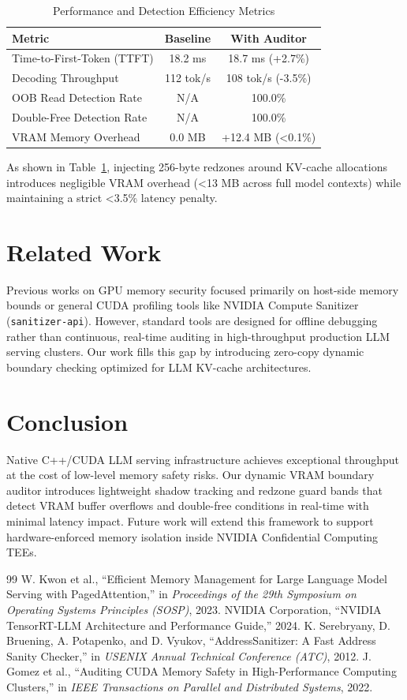 \documentclass[10pt,twocolumn,a4paper]{article}
\begin{document}
\begin{table}[h]
\centering
\caption{Performance and Detection Efficiency Metrics}
\label{tab:results}
\begin{tabular}{lcc}
\toprule
\textbf{Metric} & \textbf{Baseline} & \textbf{With Auditor} \\
\midrule
Time-to-First-Token (TTFT) & 18.2 ms & 18.7 ms (+2.7\%) \\
Decoding Throughput        & 112 tok/s & 108 tok/s (-3.5\%) \\
OOB Read Detection Rate    & N/A & 100.0\% \\
Double-Free Detection Rate  & N/A & 100.0\% \\
VRAM Memory Overhead       & 0.0 MB & +12.4 MB (<0.1\%) \\
\bottomrule
\end{tabular}
\end{table}

As shown in Table~\ref{tab:results}, injecting 256-byte redzones around KV-cache allocations introduces negligible VRAM overhead (<13 MB across full model contexts) while maintaining a strict <3.5\% latency penalty.

\section{Related Work}
Previous works on GPU memory security focused primarily on host-side memory bounds or general CUDA profiling tools like NVIDIA Compute Sanitizer (\texttt{sanitizer-api}). However, standard tools are designed for offline debugging rather than continuous, real-time auditing in high-throughput production LLM serving clusters. Our work fills this gap by introducing zero-copy dynamic boundary checking optimized for LLM KV-cache architectures.

\section{Conclusion}
Native C++/CUDA LLM serving infrastructure achieves exceptional throughput at the cost of low-level memory safety risks. Our dynamic VRAM boundary auditor introduces lightweight shadow tracking and redzone guard bands that detect VRAM buffer overflows and double-free conditions in real-time with minimal latency impact. Future work will extend this framework to support hardware-enforced memory isolation inside NVIDIA Confidential Computing TEEs.

\begin{thebibliography}{99}
 W. Kwon et al., ``Efficient Memory Management for Large Language Model Serving with PagedAttention,'' in \emph{Proceedings of the 29th Symposium on Operating Systems Principles (SOSP)}, 2023.
 NVIDIA Corporation, ``NVIDIA TensorRT-LLM Architecture and Performance Guide,'' 2024.
 K. Serebryany, D. Bruening, A. Potapenko, and D. Vyukov, ``AddressSanitizer: A Fast Address Sanity Checker,'' in \emph{USENIX Annual Technical Conference (ATC)}, 2012.
 J. Gomez et al., ``Auditing CUDA Memory Safety in High-Performance Computing Clusters,'' in \emph{IEEE Transactions on Parallel and Distributed Systems}, 2022.
\end{thebibliography}
\end{document}
